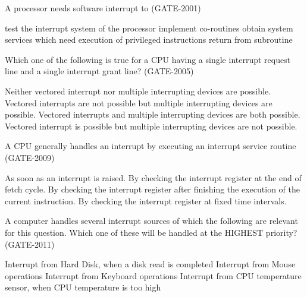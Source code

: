 \begin{questyle}
  \question  A processor needs software interrupt to  (GATE-2001)

  \begin{choices}
    \choice         test the interrupt system of the processor
    \choice         implement co-routines
    \CorrectChoice  obtain system services which need execution of privileged instructions
    \choice         return from subroutine
  \end{choices}
\end{questyle}


\begin{questyle}
  \question  Which one of the following is true for a CPU having a single interrupt request
  line and a single interrupt grant line?  (GATE-2005)

  \begin{choices}
    \choice         Neither vectored interrupt nor multiple interrupting devices are possible.
    \choice         Vectored interrupts are not possible but multiple interrupting devices are possible.
    \CorrectChoice  Vectored interrupts and multiple interrupting devices are both possible.
    \choice         Vectored interrupt is possible but multiple in­terrupting devices are not possible.
  \end{choices}
\end{questyle}


\begin{questyle}
  \question  A CPU generally handles an interrupt by executing an interrupt service routine  (GATE-2009)

  \begin{choices}
    \choice         As soon as an interrupt is raised.
    \choice         By checking the interrupt register at the end of fetch cycle.
    \CorrectChoice  By checking the interrupt register after finishing the execution of the current instruction.
    \choice         By checking the interrupt register at fixed time intervals.
  \end{choices}
\end{questyle}

\begin{questyle}
  \question  A computer handles several interrupt sources of which the following are relevant for this
  question. Which one of these will be handled at the HIGHEST priority? (GATE-2011)

  \begin{choices}
    \choice         Interrupt from Hard Disk, when a disk read is completed
    \choice         Interrupt from Mouse operations
    \choice         Interrupt from Keyboard operations
    \CorrectChoice  Interrupt from CPU temperature sensor, when CPU temperature is too high
  \end{choices}
\end{questyle}


